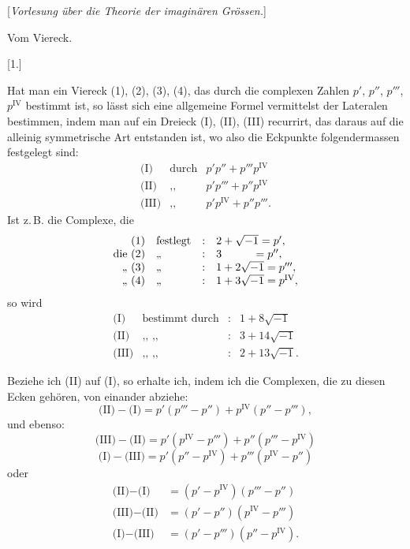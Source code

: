 
\begin{center}
[\emph{Vorlesung über die Theorie der imaginären Grössen.}]

Vom Viereck.

[1.]
\end{center}

Hat man ein Viereck (1), (2), (3), (4), das durch die complexen Zahlen $p'$, $p''$, $p'''$,
$p^{\mathrm{IV}}$ bestimmt ist, so lässt sich eine allgemeine Formel vermittelst der Lateralen
bestimmen, indem man auf ein Dreieck (I), (II), (III) recurrirt, das daraus auf die alleinig
symmetrische Art entstanden ist, wo also die Eckpunkte folgendermassen festgelegt sind:
\[
\begin{array}{rll}
\text{(I)} & \text{durch} & p'p'' + p'''p^{\mathrm{IV}} \\
\text{(II)} & \text{,,} & p'p''' + p'' p^{\mathrm{IV}} \\
\text{(III)} & \text{,,} & p'p^{\mathrm{IV}} + p'' p'''.
\end{array}
\]
Ist z.\,B. die Complexe, die
\[
\begin{array}{rlll}
\text{(1)} & \text{festlegt} & : & 2 + \sqrt{-1} = p', \\
\text{die (2)} & \text{,,} & : & 3 \hspace{2.8em} = p'', \\
\text{,, (3)} & \text{,,} & : & 1 + 2\sqrt{-1} = p''', \\
\text{,, (4)} & \text{,,} & : & 1 + 3\sqrt{-1} = p^{\mathrm{IV}},
\end{array}
\]
so wird
\[
\begin{array}{rlll}
\text{(I)} & \text{bestimmt durch} & : & 1 + 8\sqrt{-1} \\
\text{(II)} & \text{,, ,,} & : & 3 + 14\sqrt{-1} \\
\text{(III)} & \text{,, ,,} & : & 2 + 13\sqrt{-1}.
\end{array}
\]

Beziehe ich (II) auf (I), so erhalte ich, indem ich die Complexen, die zu diesen Ecken gehören,
von einander abziehe:
\[
\text{(II)} - \text{(I)} = p'(p''' - p'') + p^{\mathrm{IV}}(p'' - p'''),
\]
und ebenso:
\[
\text{(III)} - \text{(II)} = p'(p^{\mathrm{IV}} - p''') + p'' (p''' - p^{\mathrm{IV}})
\]
\[
\text{(I)} - \text{(III)} = p'(p'' - p^{\mathrm{IV}}) + p'''(p^{\mathrm{IV}} - p'')
\]
oder
\[
\begin{array}{rl}
\text{(II)} - \text{(I)} & = (p' - p^{\mathrm{IV}})(p''' - p'') \\
\text{(III)} - \text{(II)} & = (p' - p'')(p^{\mathrm{IV}} - p''') \\
\text{(I)} - \text{(III)} & = (p' - p''')(p'' - p^{\mathrm{IV}}).
\end{array}
\]

